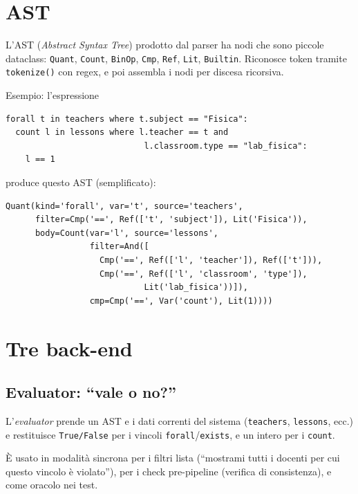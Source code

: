 \section{AST}

\begin{defbox}
L'AST (\emph{Abstract Syntax Tree}) prodotto dal
parser ha nodi che sono piccole dataclass:
\texttt{Quant}, \texttt{Count}, \texttt{BinOp},
\texttt{Cmp}, \texttt{Ref}, \texttt{Lit},
\texttt{Builtin}. Riconosce token tramite
\texttt{tokenize()} con regex, e poi assembla i nodi per
discesa ricorsiva.
\end{defbox}

Esempio: l'espressione
\begin{lstlisting}
forall t in teachers where t.subject == "Fisica":
  count l in lessons where l.teacher == t and
                            l.classroom.type == "lab_fisica":
    l == 1
\end{lstlisting}

produce questo AST (semplificato):
\begin{lstlisting}
Quant(kind='forall', var='t', source='teachers',
      filter=Cmp('==', Ref(['t', 'subject']), Lit('Fisica')),
      body=Count(var='l', source='lessons',
                 filter=And([
                   Cmp('==', Ref(['l', 'teacher']), Ref(['t'])),
                   Cmp('==', Ref(['l', 'classroom', 'type']),
                            Lit('lab_fisica'))]),
                 cmp=Cmp('==', Var('count'), Lit(1))))
\end{lstlisting}

\section{Tre back-end}

\subsection{Evaluator: ``vale o no?''}

\begin{defbox}
L'\emph{evaluator} prende un AST e
i dati correnti del sistema (\texttt{teachers},
\texttt{lessons}, ecc.) e restituisce \texttt{True/False}
per i vincoli \texttt{forall}/\texttt{exists}, e un intero
per i \texttt{count}.
\end{defbox}

\`E usato in modalit\`a sincrona per i filtri lista (``mostrami
tutti i docenti per cui questo vincolo \`e violato''), per i
check pre-pipeline (verifica di consistenza), e come oracolo
nei test.

